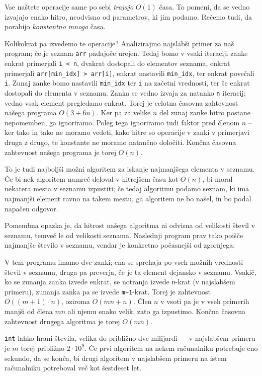 \documentclass{book}
\begin{document}
Vse naštete operacije same po sebi \emph{trajajo} \(O(1)\) časa. To pomeni, da
se vedno izvajajo enako hitro, neodvisno od parametrov, ki jim podamo. Rečemo
tudi, da porabijo \emph{konstantno mnogo} časa.

Kolikokrat pa izvedemo te operacije? Analizirajmo najslabši primer za naš
program; če je seznam \verb+arr+ padajoče urejen. Tedaj bomo v vsaki iteraciji
zanke enkrat primerjali \verb+i < n+, dvakrat dostopali do elementov seznama,
enkrat primerjali \verb+arr[min_idx] > arr[i]+, enkrat nastavili \verb+min_idx+,
ter enkrat povečali \verb+i+. Zunaj zanke bomo nastavili \verb+min_idx+ ter
\verb+i+ na začetni vrednosti, ter še enkrat dostopali do elementa v seznamu.
Zanka se vedno izvaja za natanko \verb+n+ iteracij; vedno vsak element pregledamo
enkrat. Torej je celotna časovna zahtevnost našega programa \(O(3 + 6n)\).
Ker pa za velike \(n\) del zunaj zanke hitro postane nepomemben, ga ignoriramo.
Poleg tega ignoriramo tudi faktor pred členom \(n\) -- ker tako in tako ne moramo
vedeti, kako hitre so operacije v zanki v primerjavi druga z drugo, te konstante
ne moramo natančno določiti. Končna časovna zahtevnost našega programa je torej
\(O(n)\).

To je tudi najboljši možni algoritem za iskanje najmanjšega elementa v seznamu.
Če bi nek algoritem namreč deloval v hitrejšem času kot \(O(n)\), bi moral
nekatera mesta v seznamu izpustiti; če tedaj algoritmu podamo seznam, ki ima
najmanjši element ravno na takem mestu, ga algoritem ne bo našel, in bo podal
napačen odgovor.

Pomembna opazka je, da hitrost našega algoritma ni odvisna od velikosti števil
v seznamu, temveč le od velikosti seznama. Naslednji program prav tako poišče
najmanjše število v seznamu, vendar je konkretno počasnejši od zgornjega:


V tem programu imamo dve zanki; ena se sprehaja po vseh možnih vrednosti števil
v seznamu, druga pa preverja, če je ta element dejansko v seznamu. Vsakič, ko se
zunanja zanka izvede enkrat, se notranja izvede \verb+n+-krat (v najslabšem
primeru), zunanja zanka pa se izvede \verb|m+1|-krat. Torej je zahtevnost
\(O((m+1) \cdot n)\), oziroma \(O(mn + n)\). Člen \(n\) v vsoti pa je v vseh
primerih manjši od člena \(mn\) ali njemu enako velik, zato ga izpustimo.
Končna časovna zahtevnost drugega algoritma je torej \(O(mn)\).

\verb+int+ lahko hrani števila, velika do približno dve milijardi --- v najslabšem
primeru je \(m\) torej približno \(2 \cdot 10^9\). Če prvi algoritem na nekem
računalniku potrebuje eno sekundo, da se konča, bi drugi algoritem v najslabšem
primeru na istem računalniku potreboval več kot šestdeset let.
\end{document}
